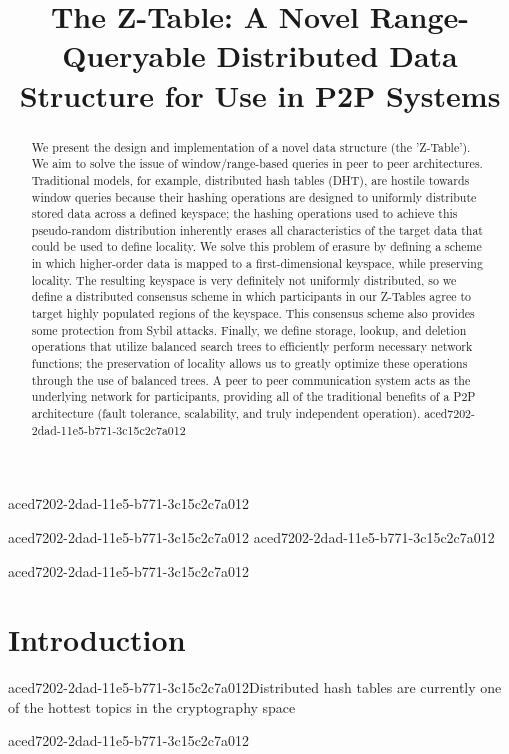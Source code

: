 \documentclass[12pt]{article}
\title{The Z-Table: A Novel Range-Queryable Distributed Data Structure for Use in P2P Systems}
\begin{document}
aced7202-2dad-11e5-b771-3c15c2c7a012\maketitle
aced7202-2dad-11e5-b771-3c15c2c7a012
aced7202-2dad-11e5-b771-3c15c2c7a012\begin{abstract}
We present the design and implementation of a novel data structure (the 'Z-Table'). We aim to solve the issue of window/range-based queries in peer to peer architectures. Traditional models, for example,  distributed hash tables (DHT), are hostile towards window queries because their hashing operations are designed to uniformly distribute stored data across a defined keyspace; the hashing operations used to achieve this pseudo-random distribution inherently erases all characteristics of the target data that could be used to define locality. We solve this problem of erasure by defining a scheme in which higher-order data is mapped to a first-dimensional keyspace, while preserving locality. The resulting keyspace is very definitely not uniformly distributed, so we define a distributed consensus scheme in which participants in our Z-Tables agree to target highly populated regions of the keyspace. This consensus scheme also provides some protection from Sybil attacks. Finally, we define storage, lookup, and deletion operations that utilize balanced search trees to efficiently perform necessary network functions; the preservation of locality allows us to greatly optimize these operations through the use of balanced trees. A peer to peer communication system acts as the underlying network for participants, providing all of the traditional benefits of a P2P architecture (fault tolerance, scalability, and truly independent operation).
aced7202-2dad-11e5-b771-3c15c2c7a012\end{abstract}


aced7202-2dad-11e5-b771-3c15c2c7a012\newpage
\section{Introduction}
aced7202-2dad-11e5-b771-3c15c2c7a012Distributed hash tables are currently one of the hottest topics in the cryptography space~\cite{Stoica:2001dj,Rowstron:2001ea,Ratnasamy:2001wn}

\printbibliography
aced7202-2dad-11e5-b771-3c15c2c7a012
\end{document}
